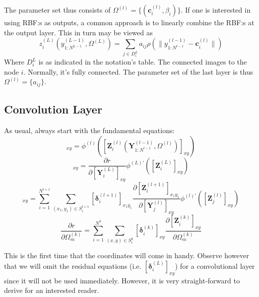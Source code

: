 \documentclass[a4paper,10pt]{article}
\theoremstyle{definition}
\begin{document}
The parameter set thus consists of $\Omega^{(l)} = \{(\pmb{c}_i^{(l)}, \beta_i) \}$. If one is interested in using RBF:s as outputs, a common approach is to linearly combine the RBF:s at the output layer. This in turn may be viewed as
\begin{equation}
z^{(L)}_{i}(y^{(L-1)}_{1:N^{L-1}}, \Omega^{(L)}) = \sum_{j \in D^{L}_i} a_{ij} \rho(\|y^{(l-1)}_{1:N^{l-1}} - \pmb{c}_i^{(l)}\|)
\end{equation}
Where $D^{L}_i$ is as indicated in the notation's table. The connected images to the node $i$. Normally, it's fully connected. The parameter set of the last layer is thus $\Omega^{(l)} = \{a_{ij} \}$.

\subsection{Convolution Layer}

As usual, always start with the fundamental equations:
\begin{equation}
[\pmb{Y}_i^{(l)}]_{xy} = \phi^{(l)}([\pmb{Z}^{(l)}_{i}(\pmb{Y}^{(l-1)}_{1:N^{l-1}}, \Omega^{(l)})]_{xy})
\end{equation}
\begin{equation}
[\pmb{\delta}_i^{(L)}]_{xy} = \frac{\partial r}{\partial [\pmb{Y}^{(L)}_i]_{xy}}\phi^{(L)'}([\pmb{Z}^{(L)}_{i}]_{xy})
\end{equation}
\begin{equation}
[\pmb{\delta}_j^{(l)}]_{xy} = \sum_{i = 1}^{N^{l+1}}\sum_{(x_1,y_1) \in S^{l+1}_i} [\pmb{\delta}^{(l+1)}_i]_{x_1y_1} \frac{\partial [\pmb{Z}^{(l + 1)}_{i}]_{x_1y_1}}{\partial [\pmb{Y}^{(l)}_j]_{xy}} \phi^{(l)'}([\pmb{Z}^{(l)}_{j}]_{xy})
\end{equation}
\begin{equation}
\frac{\partial r}{\partial \Omega^{(k)}_m} = \sum_{i = 1}^{N^{k}}\sum_{(x,y) \in S^{k}_i} [\pmb{\delta}_i^{(k)}]_{xy} \frac{\partial [\pmb{Z}^{(k)}_i]_{xy}}{\partial \Omega^{(k)}_m}
\end{equation}

This is the first time that the coordinates will come in handy. Observe however that we will omit the residual equations (i.e. $[\pmb{\delta}_i^{(L)}]_{xy}$) for a convolutional layer since it will not be used immediately. However, it is very straight-forward to derive for an interested reader.\\
\end{document}
